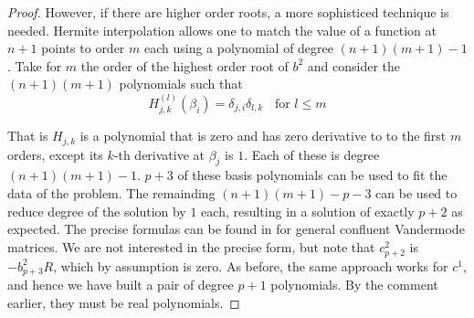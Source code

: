 \begin{lem}
\begin{proof}
However, if there are higher order roots, a more sophisticed technique is needed. Hermite interpolation allows one to match the value of a function at $n+1$ points to order $m$ each using a polynomial of degree $(n+1)(m+1)-1$. Take for $m$ the order of the highest order root of $b^2$ and consider the $(n+1)(m+1)$ polynomials such that
\[
H_{j,k}^{(l)}(β_i) = δ_{j,i}δ_{l,k}\;\;\text{ for }  l \leq m
\]

That is $H_{j,k}$ is a polynomial that is zero and has zero derivative to to the first $m$ orders, except its $k$-th derivative at $β_j$ is $1$. Each of these is degree $(n+1)(m+1)-1$. $p+3$ of these basis polynomials can be used to fit the data of the problem. The remainding $(n+1)(m+1)-p-3$ can be used to reduce degree of the solution by $1$ each, resulting in a solution of exactly $p+2$ as expected. The precise formulas can be found in  \cite{Spitzbart1960} for general confluent Vandermode matrices. We are not interested in the precise form, but note that $c^2_{p+2}$ is $-b^2_{p+3}R$, which by assumption is zero. As before, the same approach works for $c^1$, and hence we have built a pair of degree $p+1$ polynomials. By the comment earlier, they must be real polynomials.

\end{proof}
\end{lem}












